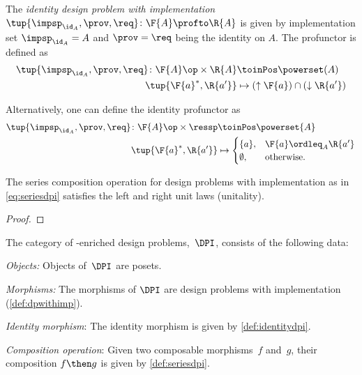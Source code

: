 \begin{definition}
    \label{def:identitydpi}
    The \emph{identity design problem with implementation}~$\tup{\impsp_{\id_A},\prov,\req} \colon \F{A} \profto \R{A}$ is given by implementation set $\impsp_{\id_A} = A$ and $\prov=\req$ being
    the identity on $A$. The profunctor is defined as
    \begin{equation}
        \begin{aligned}
            \tup{\impsp_{\id_A},\prov,\req} \colon \F{A}\op \times \R{A} &\toinPos \powerset(A) \\
            \tup{\F{a}^*,\R{a'}} &\mapsto (\uparrow \F{a}) \cap (\downarrow \R{a'})
        \end{aligned}
    \end{equation}
\end{definition}
\begin{remark}
    Alternatively, one can define the identity profunctor as
    \begin{equation}
        \begin{aligned}
            \tup{\impsp_{\id_A},\prov,\req}\colon \F{A}\op \times \ressp &\toinPos \powerset{A}\\
            \tup{\F{a}^*,\R{a'}}&\mapsto
            \begin{cases}
                \{a\},&\F{a}\ordleq_A \R{a'}\\
                \emptyset, &\text{otherwise}.
            \end{cases}
        \end{aligned}
    \end{equation}
\end{remark}

\begin{lemma}
    The series composition operation for design problems with implementation as in \cref{eq:seriesdpi} satisfies the left and right unit laws (unitality).
\end{lemma}

\begin{proof}
\end{proof}


\begin{definition}
    The category of \Set-enriched design problems,~$\DPI$, consists of the following data:
    \begin{compactenum}
        \item \emph{Objects:}  Objects of~$\DPI$ are posets.
        \item \emph{Morphisms:} The morphisms of $\DPI$ are design problems with implementation (\cref{def:dpwithimp}).
        \item \emph{Identity morphism}: The identity morphism is given by \cref{def:identitydpi}.
        \item \emph{Composition operation}: Given two composable morphisms~$f$ and~$g$, their composition $f\then g$ is given by \cref{def:seriesdpi}.
    \end{compactenum}
\end{definition}

